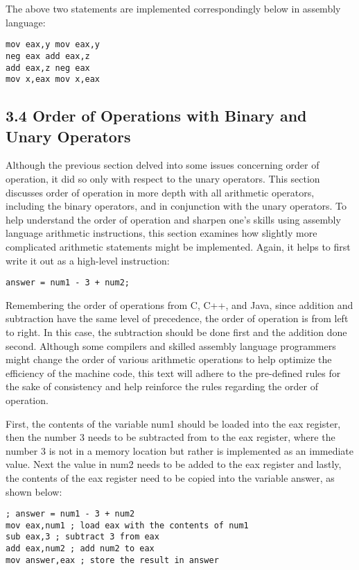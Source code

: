 \documentclass[10pt]{article}
\begin{document}
The above two statements are implemented correspondingly below in assembly language:

\begin{verbatim}
mov eax,y mov eax,y
neg eax add eax,z
add eax,z neg eax
mov x,eax mov x,eax
\end{verbatim}

\subsection*{3.4 Order of Operations with Binary and Unary Operators}
Although the previous section delved into some issues concerning order of operation, it did so only with respect to the unary operators. This section discusses order of operation in more depth with all arithmetic operators, including the binary operators, and in conjunction with the unary operators. To help understand the order of operation and sharpen one's skills using assembly language arithmetic instructions, this section examines how slightly more complicated arithmetic statements might be implemented. Again, it helps to first write it out as a high-level instruction:

\begin{verbatim}
answer = num1 - 3 + num2;
\end{verbatim}

Remembering the order of operations from C, C++, and Java, since addition and subtraction have the same level of precedence, the order of operation is from left to right. In this case, the subtraction should be done first and the addition done second. Although some compilers and skilled assembly language programmers might change the order of various arithmetic operations to help optimize the efficiency of the machine code, this text will adhere to the pre-defined rules for the sake of consistency and help reinforce the rules regarding the order of operation.

First, the contents of the variable num1 should be loaded into the eax register, then the number 3 needs to be subtracted from to the eax register, where the number 3 is not in a memory location but rather is implemented as an immediate\\
value. Next the value in num2 needs to be added to the eax register and lastly, the contents of the eax register need to be copied into the variable answer, as shown below:

\begin{verbatim}
; answer = num1 - 3 + num2
mov eax,num1 ; load eax with the contents of num1
sub eax,3 ; subtract 3 from eax
add eax,num2 ; add num2 to eax
mov answer,eax ; store the result in answer
\end{verbatim}
\end{document}
